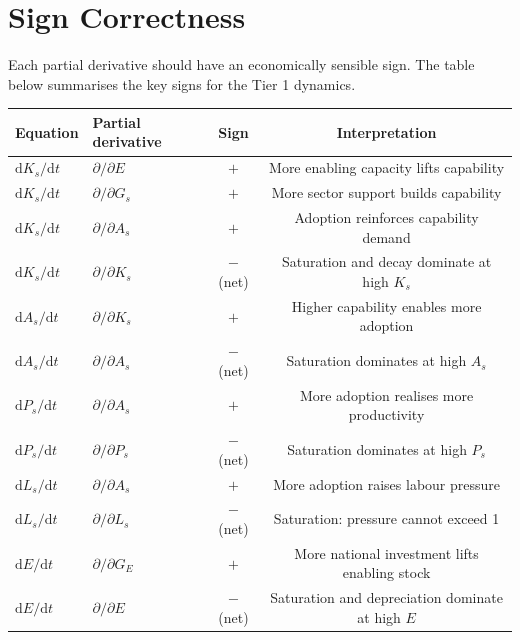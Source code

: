 \documentclass[11pt,a4paper]{article}
\begin{document}
\section{Sign Correctness}

Each partial derivative should have an economically sensible sign. The table below summarises the key signs for the Tier 1 dynamics.

\begin{center}
\begin{tabular}{llcc}
\toprule
Equation & Partial derivative & Sign & Interpretation \\
\midrule
$\mathrm{d}K_s/\mathrm{d}t$ & $\partial/\partial E$ & $+$ & More enabling capacity lifts capability \\
$\mathrm{d}K_s/\mathrm{d}t$ & $\partial/\partial G_s$ & $+$ & More sector support builds capability \\
$\mathrm{d}K_s/\mathrm{d}t$ & $\partial/\partial A_s$ & $+$ & Adoption reinforces capability demand \\
$\mathrm{d}K_s/\mathrm{d}t$ & $\partial/\partial K_s$ & $-$ (net) & Saturation and decay dominate at high $K_s$ \\
$\mathrm{d}A_s/\mathrm{d}t$ & $\partial/\partial K_s$ & $+$ & Higher capability enables more adoption \\
$\mathrm{d}A_s/\mathrm{d}t$ & $\partial/\partial A_s$ & $-$ (net) & Saturation dominates at high $A_s$ \\
$\mathrm{d}P_s/\mathrm{d}t$ & $\partial/\partial A_s$ & $+$ & More adoption realises more productivity \\
$\mathrm{d}P_s/\mathrm{d}t$ & $\partial/\partial P_s$ & $-$ (net) & Saturation dominates at high $P_s$ \\
$\mathrm{d}L_s/\mathrm{d}t$ & $\partial/\partial A_s$ & $+$ & More adoption raises labour pressure \\
$\mathrm{d}L_s/\mathrm{d}t$ & $\partial/\partial L_s$ & $-$ (net) & Saturation: pressure cannot exceed 1 \\
$\mathrm{d}E/\mathrm{d}t$   & $\partial/\partial G_E$ & $+$ & More national investment lifts enabling stock \\
$\mathrm{d}E/\mathrm{d}t$   & $\partial/\partial E$ & $-$ (net) & Saturation and depreciation dominate at high $E$ \\
\bottomrule
\end{tabular}
\end{center}
\end{document}
